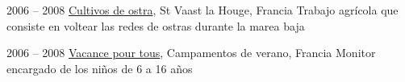 
\item[Ostrícultor]{2006 -- 2008}
	{
	\href{http://huitresdesaintvaast.fr/}{Cultivos de ostra}, St Vaast la Houge, Francia
	}
	{Trabajo agrícola que consiste en voltear las redes de ostras durante la marea baja}


\item[Animador]{2006 -- 2008}
	{
	\href{http://www.vacances-pour-tous.org/}{Vacance pour tous}, Campamentos de verano, Francia
	}
	{Monitor encargado de los niños de 6 a 16 años}
	
